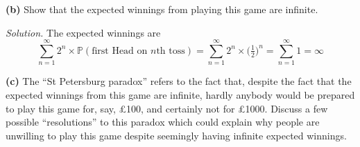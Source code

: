 \documentclass[
  a4paper,
]{book}
\theoremstyle{definition}
\theoremstyle{definition}
\theoremstyle{definition}
\theoremstyle{definition}
\theoremstyle{remark}
\begin{document}
\textbf{(b)} Show that the expected winnings from playing this game are infinite.

\begin{myanswers}
\emph{Solution.}
The expected winnings are
\[ \sum_{n=1}^\infty 2^n \times \mathbb P(\text{first Head on $n$th toss}) = \sum_{n=1}^\infty 2^n \times \big(\tfrac12\big)^n = \sum_{n=1}^\infty 1 = \infty \]

\end{myanswers}

\textbf{(c)} The ``St Petersburg paradox'' refers to the fact that, despite the fact that the expected winnings from this game are infinite, hardly anybody would be prepared to play this game for, say, £100, and certainly not for £1000. Discuss a few possible ``resolutions'' to this paradox which could explain why people are unwilling to play this game despite seemingly having infinite expected winnings.
\end{document}
